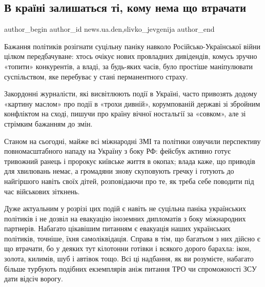  
 
 
 
 
 
\subsection{В країні залишаться ті, кому нема що втрачати}
\label{sec:27_01_2022.stz.news.ua.den.1.kraina_komu_nichogo_vtrachaty}
 
\ifcmt
 author_begin
   author_id news.ua.den,slivko_jevgenija
 author_end
\fi

Бажання політиків розігнати суцільну паніку навколо Російсько-Української війни
цілком передбачуване: хтось очікує нових провладних дивідендів, комусь зручно
«топити» конкурентів, а владі, за будь-яких часів, було простіше маніпулювати
суспільством, яке перебуває у стані перманентного страху.

Закордонні журналісти, які висвітлюють події в Україні, часто привозять додому
«картину маслом» про події в «трохи дивній», корумпованій державі зі збройним
конфліктом на сході, пишучи про країну вічної ностальгії за «совком», але зі
стрімким бажанням до змін.

Станом на сьогодні, майже всі міжнародні ЗМІ та політики озвучили перспективу
повномасштабного нападу на Україну з боку РФ: фейсбук активно готує тривожний
ранець і пророкує київське життя в окопах; влада каже, що приводів для
хвилювань немає, а громадяни знову скуповують гречку і готують до найгіршого
навіть своїх дітей, розповідаючи про те, як треба себе поводити під час
військових зіткнень.

Дуже актуальним у розрізі цих подій є навіть не суцільна паніка українських
політиків і не дозвіл на евакуацію іноземних дипломатів з боку міжнародних
партнерів. Набагато цікавішим питанням є евакуація наших українських політиків,
точніше, їхня самоліквідація.  Справа в тім, що багатьом з них дійсно є що
втрачати, бо у деяких тут кілотонни готівки і всякого дорого барахла: ікон,
золота, килимів, шуб і автівок тощо. Всі ці надбання, як ви розумієте, набагато
більше турбують подібних екземплярів аніж питання ТРО чи спроможності ЗСУ дати
відсіч ворогу.

